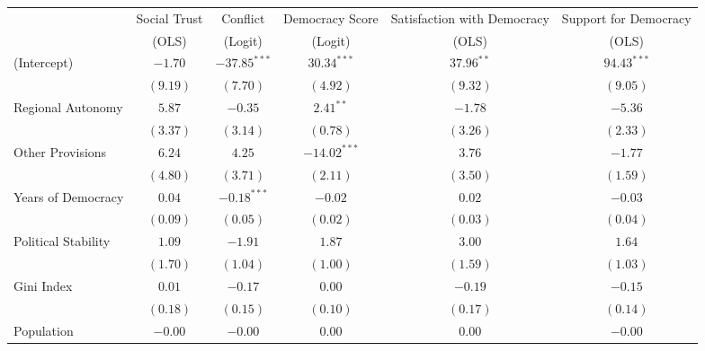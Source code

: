 
\begin{table}[!htbp]
\begin{center}
\begin{tabular}{l c c c c c}
\hline
 & \multicolumn{1}{c}{Social Trust} & \multicolumn{1}{c}{Conflict} & \multicolumn{1}{c}{Democracy Score} & \multicolumn{1}{c}{Satisfaction with Democracy} & \multicolumn{1}{c}{Support for Democracy} \\
\cline{2-2} \cline{3-3} \cline{4-4} \cline{5-5} \cline{6-6}
 & (OLS) & (Logit) & (Logit) & (OLS) & (OLS) \\
\hline
(Intercept)                        & $-1.70$   & $-37.85^{***}$ & $30.34^{***}$  & $37.96^{**}$ & $94.43^{***}$ \\
                                   & $(9.19)$  & $(7.70)$       & $(4.92)$       & $(9.32)$     & $(9.05)$      \\
Regional Autonomy                  & $5.87$    & $-0.35$        & $2.41^{**}$    & $-1.78$      & $-5.36$       \\
                                   & $(3.37)$  & $(3.14)$       & $(0.78)$       & $(3.26)$     & $(2.33)$      \\
Other Provisions                   & $6.24$    & $4.25$         & $-14.02^{***}$ & $3.76$       & $-1.77$       \\
                                   & $(4.80)$  & $(3.71)$       & $(2.11)$       & $(3.50)$     & $(1.59)$      \\
Years of Democracy                 & $0.04$    & $-0.18^{***}$  & $-0.02$        & $0.02$       & $-0.03$       \\
                                   & $(0.09)$  & $(0.05)$       & $(0.02)$       & $(0.03)$     & $(0.04)$      \\
Political Stability                & $1.09$    & $-1.91$        & $1.87$         & $3.00$       & $1.64$        \\
                                   & $(1.70)$  & $(1.04)$       & $(1.00)$       & $(1.59)$     & $(1.03)$      \\
Gini Index                         & $0.01$    & $-0.17$        & $0.00$         & $-0.19$      & $-0.15$       \\
                                   & $(0.18)$  & $(0.15)$       & $(0.10)$       & $(0.17)$     & $(0.14)$      \\
Population                         & $-0.00$   & $-0.00$        & $0.00$         & $0.00$       & $-0.00$       \\

\end{tabular}
\end{center}
\end{table}
